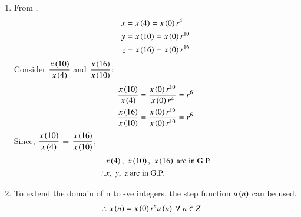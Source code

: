 \documentclass[journal,12pt,twocolumn]{IEEEtran}
\theoremstyle{remark}
\begin{document}
\begin{enumerate}
\item From ,
\begin{align}
\notag x&= x\left(4\right) =x\left(0\right)r^4 \\
\notag y&=x\left(10\right)=x\left(0\right)r^{10} \\
\notag z&=x\left(16\right)=x\left(0\right)r^{16}
\end{align}
Consider $\dfrac{x\left(10\right)}{x\left(4\right)}$ and $\dfrac{x\left(16\right)}{x\left(10\right)}$;
\begin{align}
 \dfrac{x\left(10\right)}{x\left(4\right)} &= \dfrac{x\left(0\right)r^{10}}{x\left(0\right)r^4} = r^6\\ 
 \dfrac{x\left(16\right)}{x\left(10\right)} &= \dfrac{x\left(0\right)r^{16}}{x\left(0\right)r^{10}} = r^6
\end{align}
Since, $\dfrac{x\left(10\right)}{x\left(4\right)}$ = $\dfrac{x\left(16\right)}{x\left(10\right)}$;\\
\begin{align}  
\notag   & x\left(4\right),\; x\left(10\right),\; x\left(16\right)\text{ are in G.P.} \\
\notag  \therefore & x,\; y,\; z \text{ are in G.P.}
\end{align}

\item
To extend the domain of n to -ve integers, the step function $u\left(n\right)$ can be used.
\begin{align}
 \notag    \therefore x\left(n\right) &= x\left(0\right)r^n u\left(n\right) \; \forall \;n\in Z
\end{align}


\end{enumerate}
\end{document}
